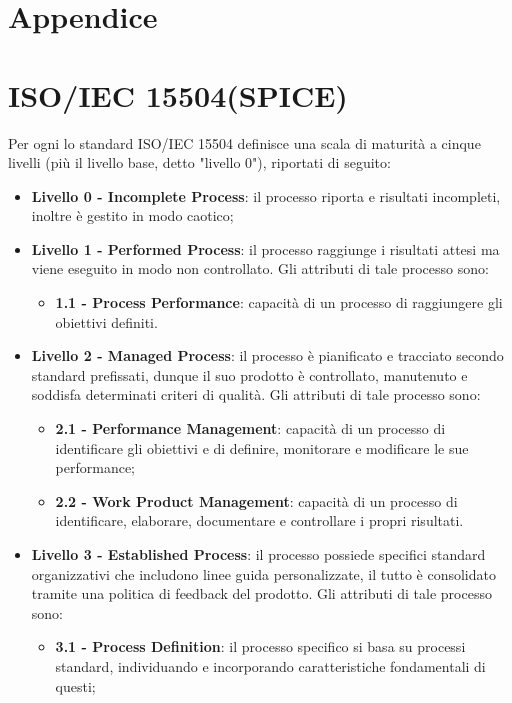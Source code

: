 \appendix
{}
\section*{Appendice}
\section{ISO/IEC 15504(SPICE)}
Per ogni  lo standard ISO/IEC 15504 definisce una scala di maturità a cinque livelli (più il livello base, detto "livello 0"), riportati di seguito:
\begin{itemize}
	\item \textbf {Livello 0 - Incomplete Process}: il processo riporta  e risultati incompleti, inoltre è gestito in modo caotico;
	\item \textbf {Livello 1 - Performed Process}:  il processo raggiunge i risultati attesi ma viene eseguito in modo non controllato. Gli attributi di tale processo sono:
	\begin{itemize}
		\item \textbf{1.1 - Process Performance}: capacità di un processo di raggiungere gli obiettivi definiti.
	\end{itemize}
	\item \textbf {Livello 2 - Managed Process}: il processo è pianificato e tracciato secondo standard prefissati, dunque il suo prodotto è controllato, manutenuto e soddisfa determinati criteri di qualità. Gli attributi di tale processo sono:
	\begin{itemize}
		\item \textbf{2.1 - Performance Management}: capacità di un processo di identificare gli obiettivi e di definire, monitorare e modificare le sue performance;
		\item \textbf{2.2 - Work Product Management}: capacità di un processo di identificare, elaborare, documentare e controllare i propri risultati.
	\end{itemize}
	\item \textbf {Livello 3 - Established Process}: il processo possiede specifici standard organizzativi che includono linee guida personalizzate, il tutto è consolidato tramite una politica di feedback del prodotto. Gli attributi di tale processo sono:
	\begin{itemize}
		\item \textbf{3.1 - Process Definition}: il processo specifico si basa su processi standard, individuando e incorporando caratteristiche fondamentali di questi;

\end{itemize}
\end{itemize}
